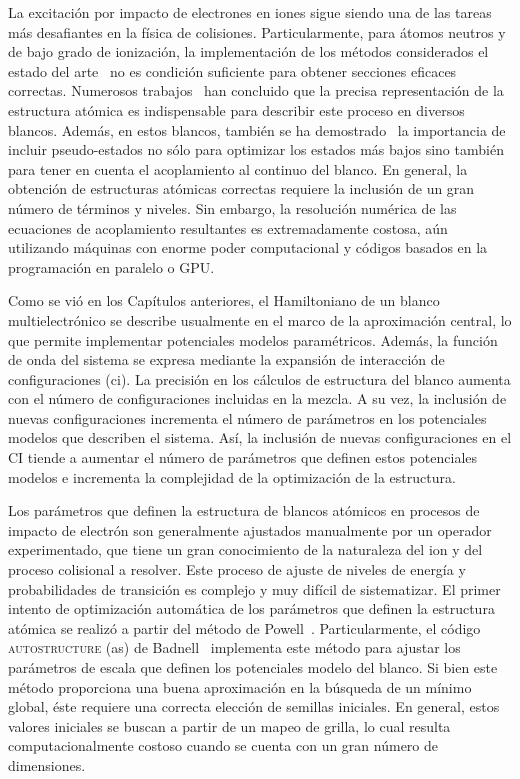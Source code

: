 La excitación por impacto de electrones en iones sigue siendo una de las 
tareas más desafiantes en la física de colisiones. Particularmente, para 
átomos neutros y de bajo grado de ionización, la implementación de los 
métodos considerados el estado del arte~\cite{Pindzola:07,Burke:11,
Bray:17,Zatsarinny:04} no es condición suficiente para obtener secciones 
eficaces correctas. Numerosos trabajos~\cite{Bartschat:04,Zatsarinny:16,
Be_Ballance:03} han concluido que la precisa representación de la 
estructura atómica es indispensable para describir este proceso en 
diversos blancos. Además, en estos blancos, también se ha 
demostrado~\cite{Ballance:03,Badnell:03,Mitnik:03} la importancia de 
incluir pseudo-estados no sólo para optimizar los estados más bajos sino 
también para tener en cuenta el acoplamiento al continuo del blanco. En 
general, la obtención de estructuras atómicas correctas requiere la 
inclusión de un gran número de términos y niveles. Sin embargo, la 
resolución numérica de las ecuaciones de acoplamiento resultantes es 
extremadamente costosa, aún utilizando máquinas con enorme poder 
computacional y códigos basados en la programación en paralelo o GPU. 

Como se vió en los Capítulos anteriores, el Hamiltoniano de un 
blanco multielectrónico se describe usualmente en el marco de la 
aproximación central, lo que permite implementar potenciales modelos 
paramétricos. Además, la función de onda del sistema se expresa mediante 
la expansión de interacción de configuraciones (\acs{ci}). La precisión 
en los cálculos de estructura del blanco aumenta con el número de 
configuraciones incluidas en la mezcla. A su vez, la inclusión de nuevas 
configuraciones incrementa el número de parámetros en los potenciales 
modelos que describen el sistema. Así, la inclusión de nuevas 
configuraciones en el CI tiende a aumentar el número de parámetros que 
definen estos potenciales modelos e incrementa la complejidad de la 
optimización de la estructura. 

Los parámetros que definen la estructura de blancos atómicos en procesos 
de impacto de electrón son generalmente ajustados manualmente por un 
operador experimentado, que tiene un gran conocimiento de la naturaleza 
del ion y del proceso colisional a resolver. Este proceso de ajuste de 
niveles de energía y probabilidades de transición es complejo y muy 
difícil de sistematizar. El primer intento de optimización automática de 
los parámetros que definen la estructura atómica se realizó a partir del 
método de Powell~\cite{Powell:64,NumRec:07}. Particularmente, el código 
\textsc{autostructure} (\acs{as}) de Badnell~\cite{Badnell:11} 
implementa este método para ajustar los parámetros de escala que definen 
los potenciales modelo del blanco. Si bien este método proporciona una 
buena aproximación en la búsqueda de un mínimo global, éste requiere una 
correcta elección de semillas iniciales. En general, estos valores 
iniciales se buscan a partir de un mapeo de grilla, lo cual resulta 
computacionalmente costoso cuando se cuenta con un gran número de 
dimensiones. 


